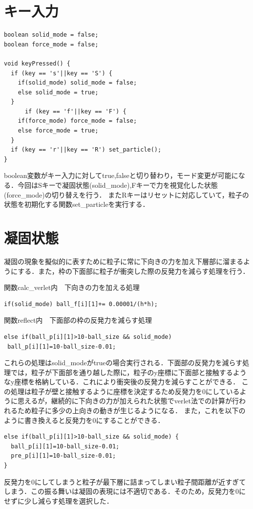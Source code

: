 \section{キー入力}
\begin{screen}
{\small
\begin{verbatim}
boolean solid_mode = false;
boolean force_mode = false;

void keyPressed() {  
  if (key == 's'||key == 'S') {
    if(solid_mode) solid_mode = false;
    else solid_mode = true;
  }
      if (key == 'f'||key == 'F') {
    if(force_mode) force_mode = false;
    else force_mode = true;
  }
  if (key == 'r'||key == 'R') set_particle();
}
\end{verbatim}}
\end{screen}
boolean変数がキー入力に対してtrue,falseと切り替わり，モード変更が可能になる．今回はSキーで凝固状態(solid\_mode),Fキーで力を視覚化した状態(force\_mode)の切り替えを行う．
またRキーはリセットに対応していて，粒子の状態を初期化する関数set\_particleを実行する．

\section{凝固状態}
凝固の現象を擬似的に表すために粒子に常に下向きの力を加え下層部に溜まるようにする．また，枠の下面部に粒子が衝突した際の反発力を減らす処理を行う．
\begin{itembox}[c]{関数calc\_verlet内　下向きの力を加える処理}
{\small
\begin{verbatim}
if(solid_mode) ball_f[i][1]+= 0.00001/(h*h);
\end{verbatim}}
\end{itembox}

\begin{itembox}[c]{関数reflect内　下面部の枠の反発力を減らす処理}
{\small
\begin{verbatim}
else if(ball_p[i][1]>10-ball_size && solid_mode)
 ball_p[i][1]=10-ball_size-0.01;
\end{verbatim}}
\end{itembox}
これらの処理はsolid\_modeがtrueの場合実行される．下面部の反発力を減らす処理では，粒子が下面部を通り越した際に，粒子のy座標に下面部と接触するようなy座標を格納している．これにより衝突後の反発力を減らすことができる．
この処理は粒子が壁と接触するように座標を決定するため反発力を0にしているように思えるが，継続的に下向きの力が加えられた状態でverlet法での計算が行われるため粒子に多少の上向きの動きが生じるようになる．
また，これを以下のように書き換えると反発力を0にすることができる．
\begin{screen}
{\small
\begin{verbatim}
else if(ball_p[i][1]>10-ball_size && solid_mode) {
  ball_p[i][1]=10-ball_size-0.01; 
  pre_p[i][1]=10-ball_size-0.01;   
}
\end{verbatim}}
\end{screen}
反発力を0にしてしまうと粒子が最下層に詰まってしまい粒子間距離が近すぎてしまう．この振る舞いは凝固の表現には不適切である．そのため，反発力を0にせずに少し減らす処理を選択した．

